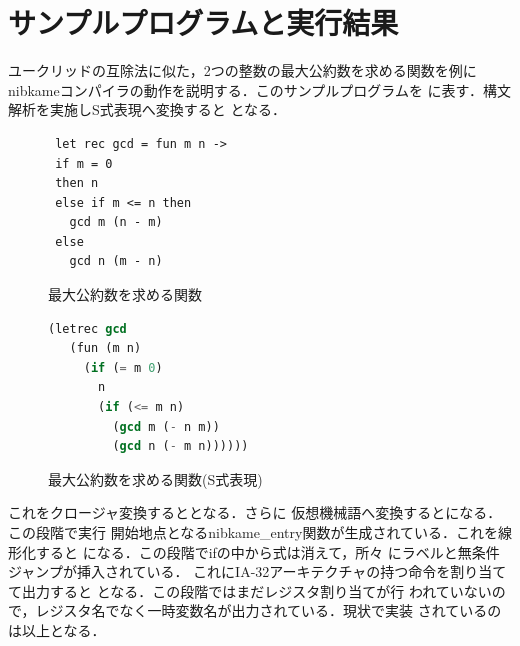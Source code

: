 \documentclass[a4paper,titlepage,report,disablejfam]{jsbook}
\begin{document}
\chapter{サンプルプログラムと実行結果}\label{ch:sample-program}
ユークリッドの互除法に似た，2つの整数の最大公約数を求める関数を例に
nibkameコンパイラの動作を説明する．このサンプルプログラムを
に表す．構文解析を実施しS式表現へ変換すると
となる．
\begin{figure}[htb]
\begin{minipage}{0.5\hsize}
 \begin{center} 
 \begin{lstlisting}
 let rec gcd = fun m n ->
 if m = 0
 then n
 else if m <= n then
   gcd m (n - m)
 else
   gcd n (m - n)   
 \end{lstlisting}
 \caption{最大公約数を求める関数}\label{fig:impl-sample}
 \end{center}
\end{minipage}
\begin{minipage}{0.5\hsize} 
 \begin{center} 
 \begin{lstlisting}[language=lisp]
 (letrec gcd
   (fun (m n)
     (if (= m 0)
       n
       (if (<= m n)
         (gcd m (- n m))
         (gcd n (- m n))))))  
 \end{lstlisting}
 \caption{最大公約数を求める関数(S式表現)}\label{fig:impl-s-sample}
 \end{center}
\end{minipage}
\end{figure}

これをクロージャ変換するととなる．さらに
仮想機械語へ変換するとになる．この段階で実行
開始地点となるnibkame\_entry関数が生成されている．これを線形化すると
になる．この段階でifの中から式は消えて，所々
にラベルと無条件ジャンプが挿入されている．
これにIA-32アーキテクチャの持つ命令を割り当てて出力すると
となる．この段階ではまだレジスタ割り当てが行
われていないので，レジスタ名でなく一時変数名が出力されている．現状で実装
されているのは以上となる．
\end{document}
